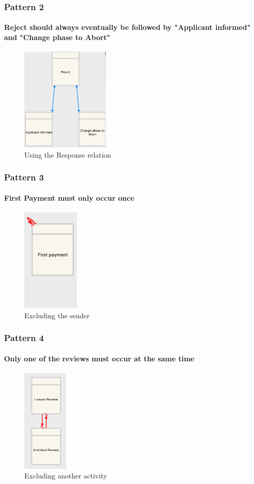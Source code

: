 \documentclass{beamer}
\begin{document}
    \begin{frame}[t]
        \frametitle{Pattern 2}
        \framesubtitle{Reject should always eventually be followed by "Applicant
        informed" and "Change phase to Abort"}
        \begin{figure}[!h]
            \centering
            \includegraphics[height=5cm]{images/dcpat2.png}
            \caption{Using the Response relation}
            \label{fig:a2}
        \end{figure}
    \end{frame}
    \begin{frame}[t]
        \frametitle{Pattern 3}
        \framesubtitle{First Payment must only occur once}
        \begin{figure}[!h]
            \centering
            \includegraphics[height=5cm]{images/dcpat3.png}
            \caption{Excluding the sender}
            \label{fig:a3}
        \end{figure}
    \end{frame}
    \begin{frame}[t]
        \frametitle{Pattern 4}
        \framesubtitle{Only one of the reviews must occur at the same time}
        \begin{figure}[!h]
            \centering
            \includegraphics[height=5cm]{images/dcpat4.png}
            \caption{Excluding another activity}
            \label{fig:a4}
        \end{figure}
    \end{frame}
\end{document}
